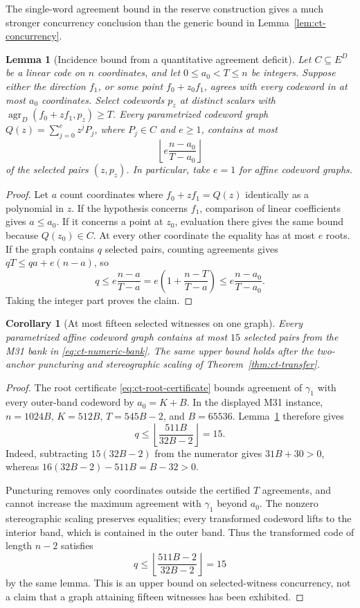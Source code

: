 \documentclass[11pt,letterpaper]{article}
\newtheorem{lemma}[theorem]{Lemma}
\newtheorem{corollary}[theorem]{Corollary}
\theoremstyle{definition}
\theoremstyle{remark}
\begin{document}
The single-word agreement bound in the reserve construction gives a much
stronger concurrency conclusion than the generic bound in
Lemma~\ref{lem:ct-concurrency}.

\begin{lemma}[Incidence bound from a quantitative agreement deficit]
\label{lem:ct-quantitative-concurrency}
Let $C\subseteq E^D$ be a linear code on $n$ coordinates, and let
$0\le a_0<T\le n$ be integers. Suppose either the direction $f_1$,
or some point $f_0+z_0f_1$, agrees with every codeword in at most
$a_0$ coordinates. Select codewords $p_z$ at distinct scalars with
$\operatorname{agr}_D(f_0+zf_1,p_z)\ge T$.
Every parametrized codeword graph $Q(z)=\sum_{j=0}^e z^jP_j$,
where $P_j\in C$ and $e\ge1$, contains at most
\[
 \left\lfloor e\frac{n-a_0}{T-a_0}\right\rfloor
\]
of the selected pairs $(z,p_z)$. In particular, take $e=1$ for affine
codeword graphs.
\end{lemma}
\begin{proof}
Let $a$ count coordinates where $f_0+zf_1=Q(z)$ identically as a
polynomial in $z$. If the hypothesis concerns $f_1$, comparison of
linear coefficients gives $a\le a_0$. If it concerns a point at $z_0$,
evaluation there gives the same bound because $Q(z_0)\in C$.
At every other coordinate the equality has at most $e$ roots.
If the graph contains $q$ selected pairs, counting agreements gives
$qT\le qa+e(n-a)$, so
\[
 q\le e\frac{n-a}{T-a}
   =e\left(1+\frac{n-T}{T-a}\right)
   \le e\frac{n-a_0}{T-a_0}.
\]
Taking the integer part proves the claim.
\end{proof}

\begin{corollary}[At most fifteen selected witnesses on one graph]
\label{cor:ct-fifteen-concurrency}
Every parametrized affine codeword graph contains at most $15$ selected
pairs from the M31 bank in \eqref{eq:ct-numeric-bank}. The same upper
bound holds after the two-anchor puncturing and stereographic scaling
of Theorem~\ref{thm:ct-transfer}.
\end{corollary}
\begin{proof}
The root certificate \eqref{eq:ct-root-certificate} bounds agreement of
$\gamma_1$ with every outer-band codeword by $a_0=K+B$. In the displayed
M31 instance, $n=1024B$, $K=512B$, $T=545B-2$, and $B=65536$.
Lemma~\ref{lem:ct-quantitative-concurrency} therefore gives
\[
 q\le\left\lfloor\frac{511B}{32B-2}\right\rfloor=15.
\]
Indeed, subtracting $15(32B-2)$ from the numerator gives $31B+30>0$,
whereas $16(32B-2)-511B=B-32>0$.

Puncturing removes only coordinates outside the certified $T$ agreements,
and cannot increase the maximum agreement with $\gamma_1$ beyond $a_0$.
The nonzero stereographic scaling preserves equalities; every transformed
codeword lifts to the interior band, which is contained in the outer band.
Thus the transformed code of length $n-2$ satisfies
\[
 q\le\left\lfloor\frac{511B-2}{32B-2}\right\rfloor=15
\]
by the same lemma. This is an upper bound on selected-witness concurrency,
not a claim that a graph attaining fifteen witnesses has been exhibited.
\end{proof}
\end{document}
